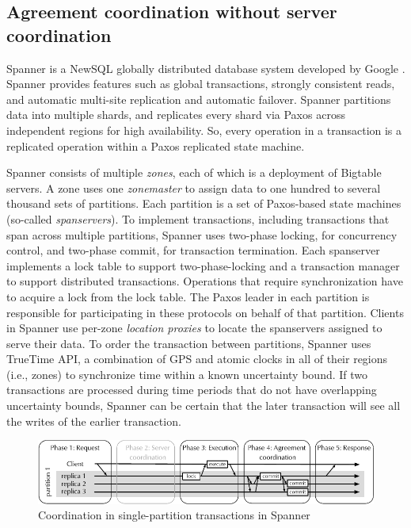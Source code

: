 \subsection{Agreement coordination without server coordination}

Spanner is a NewSQL \cite{Grolinger:2013tp} globally distributed database system
developed by Google \cite{corbett2013spanner}. Spanner provides features such as
global transactions, strongly consistent reads, and automatic multi-site
replication and automatic failover. Spanner partitions data into multiple shards, and
replicates every shard via Paxos across independent regions for high
availability. So, every operation in a transaction is a replicated operation
within a Paxos replicated state machine.

Spanner consists of multiple \emph{zones}, each of which is a deployment of
Bigtable servers. A zone uses one \emph{zonemaster} to assign data to one
hundred to several thousand sets of partitions. Each partition is a set of
Paxos-based state machines (so-called \emph{spanservers}).  To implement
transactions, including transactions that span across multiple partitions, Spanner
uses two-phase locking, for concurrency control, and two-phase commit, for transaction termination. Each
spanserver implements a lock table to support two-phase-locking and a
transaction manager to support distributed transactions. Operations that
require synchronization have to acquire a lock from the lock table. The Paxos
leader in each partition is responsible for participating in these protocols on
behalf of that partition. Clients in Spanner use per-zone \emph{location
proxies} to locate the spanservers assigned to serve their data. To order the
transaction between partitions, Spanner uses TrueTime API, a combination of GPS
and atomic clocks in all of their regions (i.e., zones) to synchronize time 
within a known uncertainty bound. If two transactions are processed during time
periods that do not have overlapping uncertainty bounds, Spanner can be certain
that the later transaction will see all the writes of the earlier transaction.

\begin{figure}[ht!]
  \begin{minipage}[b]{1.0\linewidth}
  \centering
        \includegraphics[width=1\linewidth]{figures/spanner-single-partition}
  \end{minipage}
  \caption{Coordination in single-partition transactions in Spanner}
  \label{fig:spanner-single-partition}
\end{figure}

